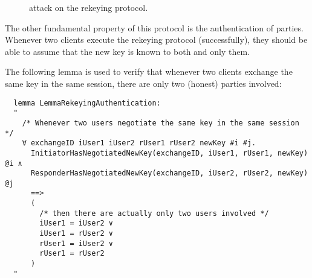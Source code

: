 \begin{figure}[t]
  \setmscoptions
  \setlength{\instdist}{2cm}
  \begin{msc}{}



    \nextlevel[2]

    \nextlevel[4]
    \nextlevel
    \nextlevel


    \nextlevel[5]
    \nextlevel
    \nextlevel


    \nextlevel[3]
    \nextlevel

  \end{msc}

  \centering
  \caption{\Uks{} attack on the rekeying protocol.}
  \label{fig:UKS}
\end{figure}

The other fundamental property of this protocol is the authentication of parties. Whenever two clients execute the rekeying protocol (successfully), they should be able to assume that the new key is known to both and only them.

The following lemma is used to verify that whenever two clients exchange the same key in the same session, there are only two (honest) parties involved:

\begin{lstlisting}
  lemma LemmaRekeyingAuthentication:
  "
    /* Whenever two users negotiate the same key in the same session */
    ∀ exchangeID iUser1 iUser2 rUser1 rUser2 newKey #i #j.
      InitiatorHasNegotiatedNewKey(exchangeID, iUser1, rUser1, newKey) @i ∧
      ResponderHasNegotiatedNewKey(exchangeID, iUser2, rUser2, newKey) @j
      ==>
      (
        /* then there are actually only two users involved */
        iUser1 = iUser2 ∨
        iUser1 = rUser2 ∨
        rUser1 = iUser2 ∨
        rUser1 = rUser2
      )
  "
\end{lstlisting}

